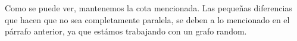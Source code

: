 Como se puede ver, mantenemos la cota mencionada. Las pequeñas diferencias que hacen que no sea completamente paralela, se deben a lo mencionado en el párrafo anterior, ya que estámos trabajando con un grafo random.












